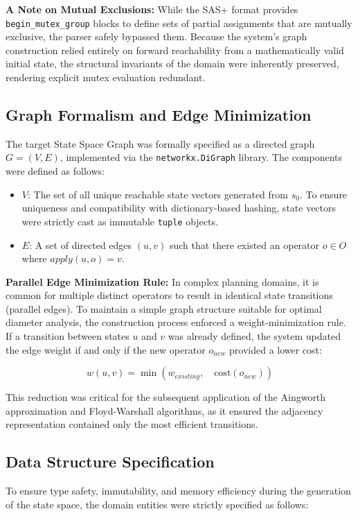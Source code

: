 \textbf{A Note on Mutual Exclusions:} While the SAS+ format provides \texttt{begin\_mutex\_group} blocks to define sets of partial assignments that are mutually exclusive, the parser safely bypassed them. Because the system's graph construction relied entirely on forward reachability from a mathematically valid initial state, the structural invariants of the domain were inherently preserved, rendering explicit mutex evaluation redundant.

\subsection{Graph Formalism and Edge Minimization}
The target State Space Graph was formally specified as a directed graph $G = (V, E)$, implemented via the \texttt{networkx.DiGraph} library. The components were defined as follows:

\begin{itemize}
    \item $V$: The set of all unique reachable state vectors generated from $s_0$. To ensure uniqueness and compatibility with dictionary-based hashing, state vectors were strictly cast as immutable \texttt{tuple} objects.
    \item $E$: A set of directed edges $(u, v)$ such that there existed an operator $o \in O$ where $apply(u, o) = v$. 
\end{itemize}

\textbf{Parallel Edge Minimization Rule:} In complex planning domains, it is common for multiple distinct operators to result in identical state transitions (parallel edges). To maintain a simple graph structure suitable for optimal diameter analysis, the construction process enforced a weight-minimization rule. If a transition between states $u$ and $v$ was already defined, the system updated the edge weight if and only if the new operator $o_{new}$ provided a lower cost:

\[
w(u, v) = \min(w_{existing}, \quad \text{cost}(o_{new}))
\]

This reduction was critical for the subsequent application of the Aingworth approximation and Floyd-Warshall algorithms, as it ensured the adjacency representation contained only the most efficient transitions.

\subsection{Data Structure Specification}
To ensure type safety, immutability, and memory efficiency during the generation of the state space, the domain entities were strictly specified as follows:

